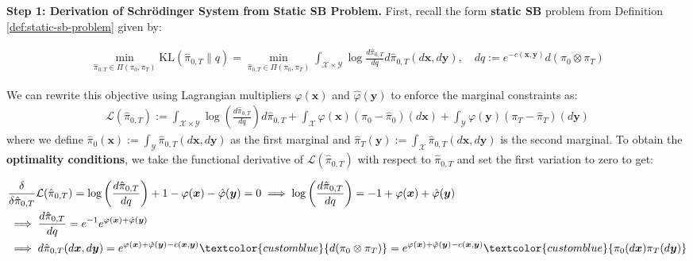 \documentclass{article}
\newcommand{\bluetext}[1]{\textcolor{customblue}{#1}}
\begin{document}
\textbf{Step 1: Derivation of Schrödinger System from Static SB Problem.}
First, recall the form \textbf{static SB} problem from Definition \ref{def:static-sb-problem} given by:
\begin{small}
\begin{align}
    \min_{\hat{\pi}_{0,T}\in \Pi(\pi_0, \pi_T)}\text{KL}(\hat{\pi}_{0,T}\|q)=\min_{\hat{\pi}_{0,T}\in \Pi(\pi_0, \pi_T)}\int_{\mathcal{X}\times\mathcal{Y}}\log \frac{d\hat{\pi}_{0,T}}{dq}d\hat{\pi}_{0,T}(d\boldsymbol{x},d\boldsymbol{y}), \quad dq:=e^{-c(\boldsymbol{x},\boldsymbol{y})}d(\pi_0\otimes \pi_T)
\end{align}
\end{small}
We can rewrite this objective using Lagrangian multipliers $\varphi(\boldsymbol{x})$ and $\hat{\varphi}(\boldsymbol{y})$ to enforce the marginal constraints as:
\begin{align}
    \mathcal{L}(\hat{\pi}_{0,T}):=\int_{\mathcal{X}\times\mathcal{Y}}\log \left(\frac{d\hat{\pi}_{0,T}}{dq}\right)d\hat{\pi}_{0,T}+\int_{\mathcal{X}}\varphi(\boldsymbol{x})(\pi_0-\hat{\pi}_0)(d\boldsymbol{x})+\int_{\mathcal{Y}}\varphi(\boldsymbol{y})(\pi_T-\hat{\pi}_T)(d\boldsymbol{y})
\end{align}
where we define $\hat{\pi}_0(\boldsymbol{x}):= \int_{\mathcal{Y}}\hat{\pi}_{0,T}(d\boldsymbol{x}, d\boldsymbol{y})$ as the first marginal and $\hat{\pi}_{T}(\boldsymbol{y}):=\int_{\mathcal{X}}\hat{\pi}_{0,T}(d\boldsymbol{x}, d\boldsymbol{y})$ is the second marginal. To obtain the \textbf{optimality conditions}, we take the functional derivative of $\mathcal{L}(\hat{\pi}_{0,T})$ with respect to $\hat{\pi}_{0,T}$ and set the first variation to zero to get:
\begin{small}
\begin{align}
    &\frac{\delta}{\delta\hat{\pi}_{0,T}}\mathcal{L}(\hat{\pi}_{0,T})=\log \left(\frac{d\hat{\pi}_{0,T}}{dq}\right)+1-\varphi(\boldsymbol{x})-\hat{\varphi}(\boldsymbol{y})=0\implies \log \left(\frac{d\hat{\pi}_{0,T}}{dq}\right)=-1+\varphi(\boldsymbol{x})+\hat{\varphi}(\boldsymbol{y})\nonumber\\
    &\implies \frac{d\hat{\pi}_{0,T}}{dq}=e^{-1}e^{\varphi(\boldsymbol{x})+\hat{\varphi}(\boldsymbol{y})}\nonumber\\
    &\implies d\hat{\pi}_{0,T}(d\boldsymbol{x},d\boldsymbol{y})=e^{\varphi(\boldsymbol{x})+\hat{\varphi}(\boldsymbol{y})-c(\boldsymbol{x},\boldsymbol{y})}\bluetext{d(\pi_0\otimes\pi_T)}=e^{\varphi(\boldsymbol{x})+\hat{\varphi}(\boldsymbol{y})-c(\boldsymbol{x},\boldsymbol{y})}\bluetext{\pi_0(d\boldsymbol{x})\pi_T(d\boldsymbol{y})}
\end{align}
\end{small}
\end{document}
